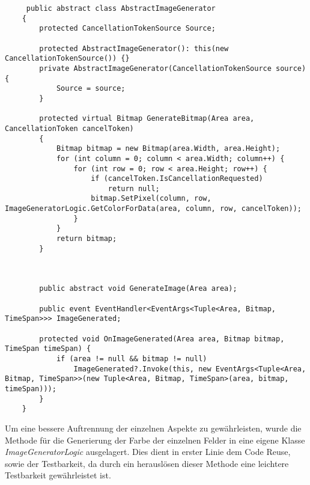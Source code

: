 \documentclass[a4paper,ngerman]{scrartcl}
\begin{document}
\begin{lstlisting}
     public abstract class AbstractImageGenerator 
    {
        protected CancellationTokenSource Source;

        protected AbstractImageGenerator(): this(new CancellationTokenSource()) {}
        private AbstractImageGenerator(CancellationTokenSource source) {
            Source = source;
        }

        protected virtual Bitmap GenerateBitmap(Area area, CancellationToken cancelToken)
        {
            Bitmap bitmap = new Bitmap(area.Width, area.Height);
            for (int column = 0; column < area.Width; column++) {
                for (int row = 0; row < area.Height; row++) {
                    if (cancelToken.IsCancellationRequested)
                        return null;
                    bitmap.SetPixel(column, row, ImageGeneratorLogic.GetColorForData(area, column, row, cancelToken));
                }
            }
            return bitmap;
        }



        public abstract void GenerateImage(Area area);

        public event EventHandler<EventArgs<Tuple<Area, Bitmap, TimeSpan>>> ImageGenerated;

        protected void OnImageGenerated(Area area, Bitmap bitmap, TimeSpan timeSpan) {
            if (area != null && bitmap != null)
                ImageGenerated?.Invoke(this, new EventArgs<Tuple<Area, Bitmap, TimeSpan>>(new Tuple<Area, Bitmap, TimeSpan>(area, bitmap, timeSpan)));
        }
    }
\end{lstlisting}

Um eine bessere Auftrennung der einzelnen Aspekte zu gewährleisten, wurde die Methode für die Generierung der Farbe der einzelnen Felder in eine eigene Klasse \textit{ImageGeneratorLogic} ausgelagert. Dies dient in erster Linie dem Code Reuse, sowie der Testbarkeit, da durch ein herauslösen dieser Methode eine leichtere Testbarkeit gewährleistet ist.
\end{document}
